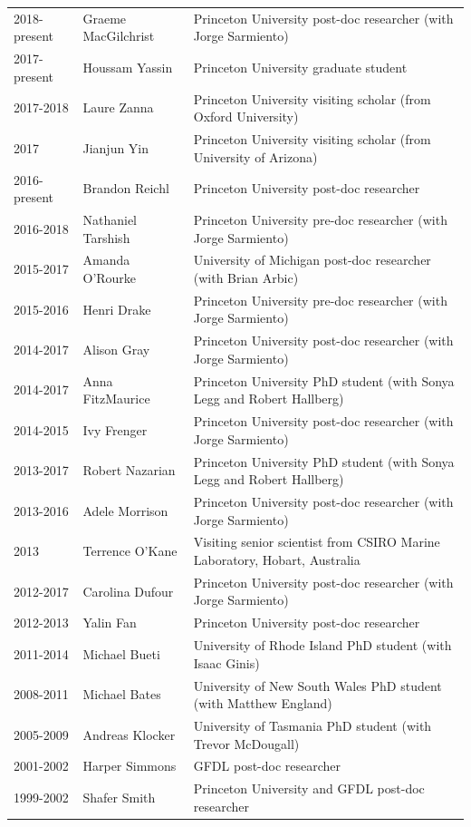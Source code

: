 \documentclass{article}
\begin{document}
\begin{tabular}{lll}
2018-present & Graeme MacGilchrist & Princeton University post-doc researcher (with Jorge Sarmiento) \\ 
2017-present & Houssam Yassin & Princeton University graduate student \\ 
2017-2018 & Laure Zanna  & Princeton University visiting scholar (from Oxford University)  \\
2017 & Jianjun Yin       & Princeton University visiting scholar (from University of Arizona)  \\
2016-present & Brandon Reichl       & Princeton University post-doc researcher  \\
2016-2018 & Nathaniel Tarshish & Princeton University pre-doc researcher (with Jorge Sarmiento) \\
2015-2017 & Amanda O'Rourke  & University of Michigan post-doc researcher (with Brian Arbic) \\
2015-2016    & Henri Drake             & Princeton University pre-doc researcher (with Jorge Sarmiento) \\
2014-2017 & Alison Gray            & Princeton University post-doc researcher (with Jorge Sarmiento) \\
2014-2017 & Anna FitzMaurice   & Princeton University PhD student (with Sonya Legg and Robert Hallberg) \\ 
2014-2015     & Ivy Frenger            & Princeton University post-doc researcher (with Jorge Sarmiento) \\
2013-2017 & Robert Nazarian    & Princeton University PhD student (with Sonya Legg and Robert Hallberg) \\ 
2013-2016     & Adele Morrison     & Princeton University post-doc researcher (with Jorge Sarmiento) \\
2013               & Terrence O'Kane   & Visiting senior scientist from CSIRO Marine Laboratory, Hobart, Australia \\
2012-2017     & Carolina Dufour   & Princeton University post-doc researcher (with Jorge Sarmiento)  \\
2012-2013     & Yalin Fan              & Princeton University post-doc researcher \\
2011-2014     & Michael Bueti       & University of Rhode Island  PhD student (with Isaac Ginis) \\
2008-2011     & Michael Bates       & University of New South Wales PhD student (with Matthew England) \\
2005-2009     & Andreas Klocker   & University of Tasmania  PhD student (with Trevor McDougall) \\
2001-2002     & Harper Simmons   & GFDL post-doc researcher \\
1999-2002     & Shafer Smith         & Princeton University and GFDL post-doc researcher     \\
\end{tabular}
\end{document}
